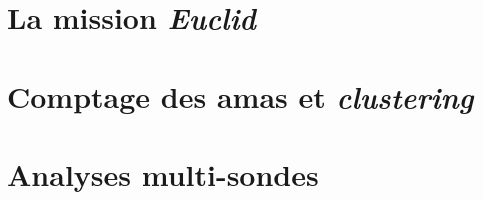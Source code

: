%
%

{\color{vert}\lipsum[2-3]}

\section{La mission \emph{Euclid}}
{\color{vert}\lipsum[2-5]}

\section{Comptage des amas et \emph{clustering}}
{\color{vert}\lipsum[2-5]}

\section{Analyses multi-sondes}
{\color{vert}\lipsum[2-5]}
